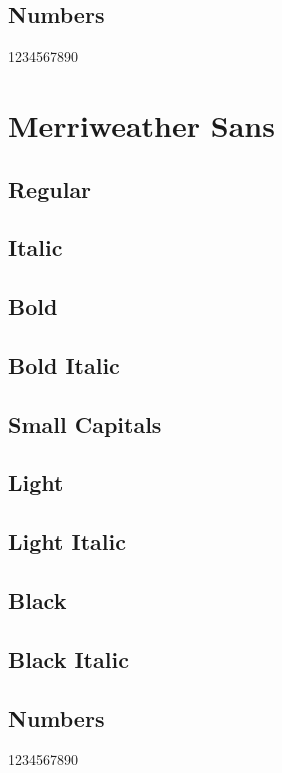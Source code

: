 \documentclass{article}
\begin{document}
\textit{\merriweatherblack\lipsum[8]}


\subsection*{Numbers}

1234567890

\section{Merriweather Sans}\sf

\subsection*{Regular}
\lipsum[1]

\subsection*{Italic}
\textit{\lipsum[2]}

\subsection*{Bold}
\textbf{\lipsum[3]}

\subsection*{Bold Italic}

\textbf{\textit{\lipsum[4]}}

\subsection*{Small Capitals}

\textsc{\lipsum[9]}

\subsection*{Light}

{\merriweathersanslight\lipsum[5]}

\subsection*{Light Italic}

\textit{\merriweathersanslight\lipsum[6]}

\subsection*{Black}

{\merriweathersansblack\lipsum[7]}

\subsection*{Black Italic}

\textit{\merriweathersansblack\lipsum[8]}

\subsection*{Numbers}

1234567890
\end{document}
